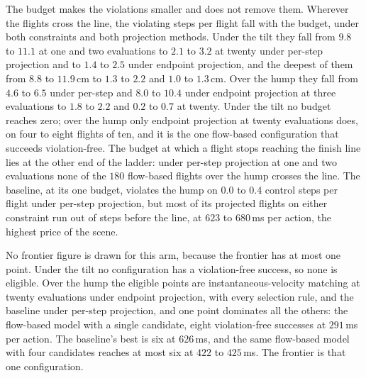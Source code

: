 The budget makes the violations smaller and does not remove them. Wherever the flights cross the line,
the violating steps per flight fall with the budget, under both constraints and both projection methods.
Under the tilt they fall from
$9.8$ to $11.1$ at one and two evaluations to $2.1$ to $3.2$ at twenty under per-step projection and to
$1.4$ to $2.5$ under endpoint projection, and the deepest of them from $8.8$ to $11.9$\,cm to $1.3$ to
$2.2$ and $1.0$ to $1.3$\,cm. Over the hump they fall from $4.6$ to $6.5$ under per-step and $8.0$ to
$10.4$ under endpoint projection at three evaluations to $1.8$ to $2.2$ and $0.2$ to $0.7$ at twenty.
Under the tilt no budget reaches zero; over the hump only endpoint projection at twenty evaluations does,
on four to eight flights of ten, and it is the one flow-based configuration that succeeds violation-free.
The budget at
which a flight stops reaching the finish line lies at the other end of the ladder: under per-step
projection at one and two evaluations none of the $180$ flow-based flights over the hump crosses the
line. The baseline, at its one budget, violates the hump on $0.0$ to $0.4$ control steps per flight
under per-step projection, but most of its projected flights on either constraint run out of steps before
the line, at $623$ to $680$\,ms per action, the highest price of the scene.

No frontier figure is drawn for this arm, because the frontier has at most one point. Under the tilt no
configuration has a violation-free success, so none is eligible. Over the hump the eligible points are
instantaneous-velocity matching at twenty evaluations under endpoint projection, with every selection
rule, and the baseline under per-step projection, and one point dominates all the others: the flow-based
model with a single candidate, eight violation-free successes at $291$\,ms per action. The baseline's best
is six at $626$\,ms, and the same flow-based model with four candidates reaches at most six at $422$ to
$425$\,ms. The frontier is that one configuration.

